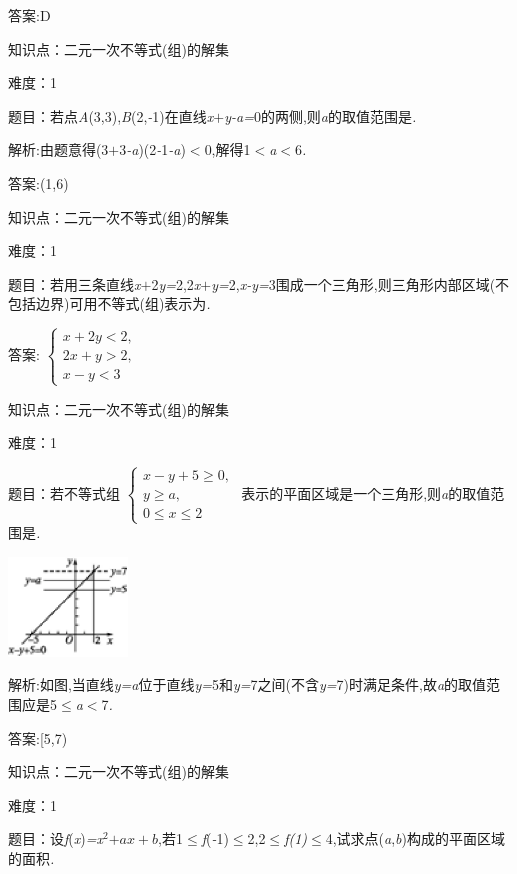 \documentclass{article} %
\begin{document}
 答案:D

知识点：二元一次不等式(组)的解集

难度：1

 题目：若点\textit{A}(3,3),\textit{B}(2,\textit{-}1)在直线\textit{x$+$y-a=}0的两侧,则\textit{a}的取值范围是\textit{\underbar{　　　}.~}

 解析:由题意得(3\textit{$+$}3\textit{-a})(2\textit{-}1\textit{-a})\textit{$<$}0,解得1\textit{$<$a$<$}6\textit{.}

 答案:(1,6)

知识点：二元一次不等式(组)的解集

难度：1

 题目：若用三条直线\textit{x$+$}2\textit{y=}2,2\textit{x$+$y=}2,\textit{x-y=}3围成一个三角形,则三角形内部区域(不包括边界)可用不等式(组)表示为\textit{\underbar{　　　　　}.~}

 答案:
$
\begin{cases}
x+2y <2,\\
2x +y >2,\\
x-y <3
\end{cases}$


知识点：二元一次不等式(组)的解集

难度：1

 题目：若不等式组
$
\begin{cases}
x-y+5 \ge 0,\\
y \ge a,\\
0 \le x \le 2
\end{cases}$
表示的平面区域是一个三角形,则\textit{a}的取值范围是\textit{\underbar{　　　　　}.~}

 \includegraphics*[width=1.25in, height=1.04in, keepaspectratio=false]{image1514}

 解析:如图,当直线\textit{y=a}位于直线\textit{y=}5和\textit{y=}7之间(不含\textit{y=}7)时满足条件,故\textit{a}的取值范围应是5$\mathrm{\le}$\textit{a$<$}7\textit{.}

 答案:[5,7)

知识点：二元一次不等式(组)的解集

难度：1

 题目：设\textit{f}(\textit{x})\textit{=x}${}^{2}$\textit{$+ax+b$},若1$\mathrm{\le}$\textit{f}(\textit{-}1)$\mathrm{\le}$2,2$\mathrm{\le}$\textit{f(1)}$\mathrm{\le}$4,试求点(\textit{a},\textit{b})构成的平面区域的面积\textit{.}
\end{document}
